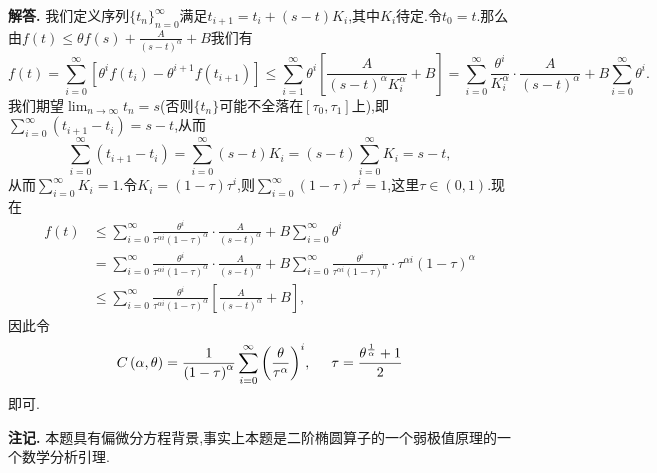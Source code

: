 \documentclass{article}
\newenvironment{solution}{\par\noindent\textbf{解答. }}{\par}
\newenvironment{note}{\par\noindent\textbf{注记. }}{\par}
\begin{document}
\begin{solution}
我们定义序列$\{t_n\}_{n=0}^\infty$满足$t_{i+1}=t_i+(s-t)K_i$,其中$K_i$待定.令$t_0=t$.那么由$f(t)\le\theta f(s)+\frac{A}{(s-t)^\alpha}+B$我们有
$$
f\left( t \right) =\sum_{i=0}^{\infty}{\left[ \theta ^if\left( t_i \right) -\theta ^{i+1}f\left( t_{i+1} \right) \right]}\le \sum_{i=1}^{\infty}{\theta ^i\left[ \frac{A}{\left( s-t \right) ^{\alpha}K_{i}^{\alpha}}+B \right]}=\sum_{i=0}^{\infty}{\frac{\theta ^i}{K_{i}^{\alpha}}\cdot \frac{A}{\left( s-t \right) ^{\alpha}}}+B\sum_{i=0}^{\infty}{\theta ^i}.
$$
我们期望$\lim_{n\to\infty}t_n=s$(否则$\{t_n\}$可能不全落在$[\tau_0,\tau_1]$上),即$\sum_{i=0}^\infty(t_{i+1}-t_i)=s-t$,从而
$$
\sum_{i=0}^{\infty}{\left( t_{i+1}-t_i \right)}=\sum_{i=0}^{\infty}{\left( s-t \right) K_i}=\left( s-t \right) \sum_{i=0}^{\infty}{K_i}=s-t,
$$
从而$\sum_{i=0}^\infty K_i=1$.令$K_i=(1-\tau)\tau^i$,则$\sum_{i=0}^\infty(1-\tau)\tau^i=1$,这里$\tau\in(0,1)$.现在
$$
\begin{aligned}
f\left( t \right) &\le \sum_{i=0}^{\infty}{\frac{\theta ^i}{\tau ^{\alpha i}\left( 1-\tau \right) ^{\alpha}}\cdot \frac{A}{\left( s-t \right) ^{\alpha}}}+B\sum_{i=0}^{\infty}{\theta ^i}
\\
&=\sum_{i=0}^{\infty}{\frac{\theta ^i}{\tau ^{\alpha i}\left( 1-\tau \right) ^{\alpha}}\cdot \frac{A}{\left( s-t \right) ^{\alpha}}}+B\sum_{i=0}^{\infty}{\frac{\theta ^i}{\tau ^{\alpha i}\left( 1-\tau \right) ^{\alpha}}\cdot \tau ^{\alpha i}\left( 1-\tau \right) ^{\alpha}}
\\
&\le \sum_{i=0}^{\infty}{\frac{\theta ^i}{\tau ^{\alpha i}\left( 1-\tau \right) ^{\alpha}}\left[ \frac{A}{\left( s-t \right) ^{\alpha}}+B \right]},
\end{aligned}
$$
因此令
$$
C\left( \alpha ,\theta \right) =\frac{1}{\left( 1-\tau \right) ^{\alpha}}\sum_{i=0}^{\infty}{\left( \frac{\theta}{\tau ^{\alpha}} \right) ^i},\hspace{0.5cm}\tau =\frac{\theta ^{\frac{1}{\alpha}}+1}{2}
$$
即可.
\end{solution}
\begin{note}
本题具有偏微分方程背景,事实上本题是二阶椭圆算子的一个弱极值原理的一个数学分析引理.
\end{note}
\newpage
\end{document}

